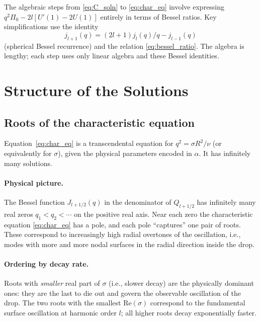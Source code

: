 \documentclass[12pt]{article}
\theoremstyle{definition}
\begin{document}
\begin{notebox}
The algebraic steps from \eqref{eq:C_soln} to \eqref{eq:char_eq} involve expressing
$q^2\Pi_0 - 2l[U'(1)-2U(1)]$ entirely in terms of Bessel ratios. Key simplifications
use the identity
\[
  j_{l+1}(q) = (2l+1)j_l(q)/q - j_{l-1}(q)
\]
(spherical Bessel recurrence) and the relation \eqref{eq:bessel_ratio}.
The algebra is lengthy; each step uses only linear algebra and
these Bessel identities.
\end{notebox}

\section{Structure of the Solutions}

\subsection{Roots of the characteristic equation}

Equation~\eqref{eq:char_eq} is a transcendental equation for $q^2 = \sigma R^2/\nu$
(or equivalently for $\sigma$), given the physical parameters encoded in $\alpha$.
It has infinitely many solutions.

\paragraph{Physical picture.} The Bessel function $J_{l+1/2}(q)$ in the denominator of
$Q_{l+1/2}$ has infinitely many real zeros $q_1 < q_2 < \cdots$ on the positive real axis.
Near each zero the characteristic equation \eqref{eq:char_eq} has a pole, and each pole
``captures'' one pair of roots. These correspond to increasingly high radial overtones of
the oscillation, i.e., modes with more and more nodal surfaces in the radial direction
inside the drop.

\paragraph{Ordering by decay rate.} Roots with \emph{smaller} real part of $\sigma$ (i.e.,
slower decay) are the physically dominant ones: they are the last to die out and govern
the observable oscillation of the drop. The two roots with the smallest $\mathrm{Re}(\sigma)$
correspond to the fundamental surface oscillation at harmonic order $l$; all higher roots
decay exponentially faster.
\end{document}
